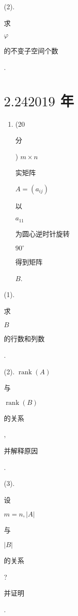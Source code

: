 \documentclass[10pt]{article}
\begin{document}
(2). \begin{CJK}{UTF8}{mj}求\end{CJK} $\varphi$ \begin{CJK}{UTF8}{mj}的不变子空间个数\end{CJK}.

\section{$2.242019$ 年}
\begin{enumerate}
  \item (20 \begin{CJK}{UTF8}{mj}分\end{CJK}) $m \times n$ \begin{CJK}{UTF8}{mj}实矩阵\end{CJK} $A=\left(a_{i j}\right)$ \begin{CJK}{UTF8}{mj}以\end{CJK} $a_{11}$ \begin{CJK}{UTF8}{mj}为圆心逆时针旋转\end{CJK} $90^{\circ}$ \begin{CJK}{UTF8}{mj}得到矩阵\end{CJK} $B$.
\end{enumerate}
(1). \begin{CJK}{UTF8}{mj}求\end{CJK} $B$ \begin{CJK}{UTF8}{mj}的行数和列数\end{CJK}.

(2). $\operatorname{rank}(A)$ \begin{CJK}{UTF8}{mj}与\end{CJK} $\operatorname{rank}(B)$ \begin{CJK}{UTF8}{mj}的关系\end{CJK}, \begin{CJK}{UTF8}{mj}并解释原因\end{CJK}.

(3). \begin{CJK}{UTF8}{mj}设\end{CJK} $m=n,|A|$ \begin{CJK}{UTF8}{mj}与\end{CJK} $|B|$ \begin{CJK}{UTF8}{mj}的关系\end{CJK}? \begin{CJK}{UTF8}{mj}并证明\end{CJK}.
\end{document}
